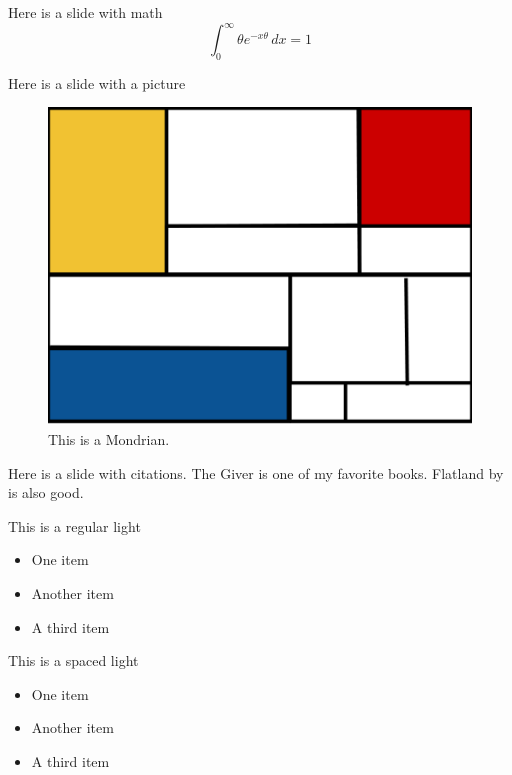 \begin{frame}{Here is a slide with math}
  $$\int_0^\infty \theta e^{-x\theta}\, dx = 1$$
\end{frame}

\begin{frame}{Here is a slide with a picture}
  \begin{figure}
    \centering
    \includegraphics[scale=0.2]{img/mondrian.png}
    \caption{This is a Mondrian.}
  \end{figure}
\end{frame}

\begin{frame}{Here is a slide with citations.}
  The Giver \citep{lowry1993giver} is one of my favorite books.
  Flatland by \cite{abbott1884flatland} is also good.
\end{frame}


\begin{frame}
  \begin{block}{This is a regular light}
    \begin{itemize}
      \item One item
      \item Another item
      \item A third item
    \end{itemize}
  \end{block}

   \begin{block}{This is a spaced light}
    \begin{itemize}
      \setlength\itemsep{1em}
      \item One item
      \item Another item
      \item A third item
    \end{itemize}
  \end{block}

 
\end{frame}
